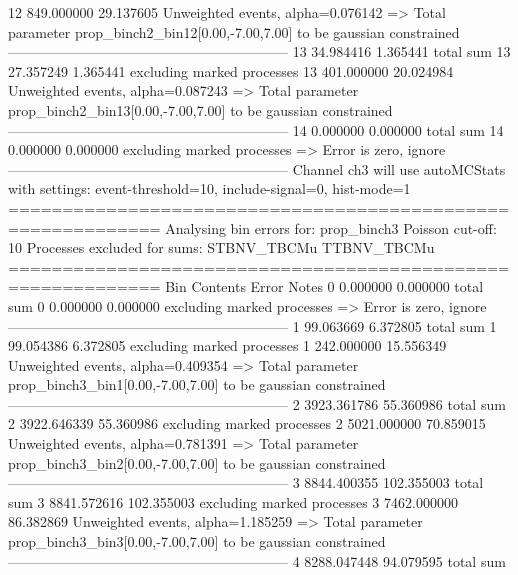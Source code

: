 12         849.000000      29.137605       Unweighted events, alpha=0.076142
  => Total parameter prop_binch2_bin12[0.00,-7.00,7.00] to be gaussian constrained
------------------------------------------------------------
13         34.984416       1.365441        total sum                     
13         27.357249       1.365441        excluding marked processes    
13         401.000000      20.024984       Unweighted events, alpha=0.087243
  => Total parameter prop_binch2_bin13[0.00,-7.00,7.00] to be gaussian constrained
------------------------------------------------------------
14         0.000000        0.000000        total sum                     
14         0.000000        0.000000        excluding marked processes    
  => Error is zero, ignore      
------------------------------------------------------------
Channel ch3 will use autoMCStats with settings: event-threshold=10, include-signal=0, hist-mode=1
============================================================
Analysing bin errors for: prop_binch3
Poisson cut-off: 10
Processes excluded for sums: STBNV_TBCMu TTBNV_TBCMu
============================================================
Bin        Contents        Error           Notes                         
0          0.000000        0.000000        total sum                     
0          0.000000        0.000000        excluding marked processes    
  => Error is zero, ignore      
------------------------------------------------------------
1          99.063669       6.372805        total sum                     
1          99.054386       6.372805        excluding marked processes    
1          242.000000      15.556349       Unweighted events, alpha=0.409354
  => Total parameter prop_binch3_bin1[0.00,-7.00,7.00] to be gaussian constrained
------------------------------------------------------------
2          3923.361786     55.360986       total sum                     
2          3922.646339     55.360986       excluding marked processes    
2          5021.000000     70.859015       Unweighted events, alpha=0.781391
  => Total parameter prop_binch3_bin2[0.00,-7.00,7.00] to be gaussian constrained
------------------------------------------------------------
3          8844.400355     102.355003      total sum                     
3          8841.572616     102.355003      excluding marked processes    
3          7462.000000     86.382869       Unweighted events, alpha=1.185259
  => Total parameter prop_binch3_bin3[0.00,-7.00,7.00] to be gaussian constrained
------------------------------------------------------------
4          8288.047448     94.079595       total sum                     
